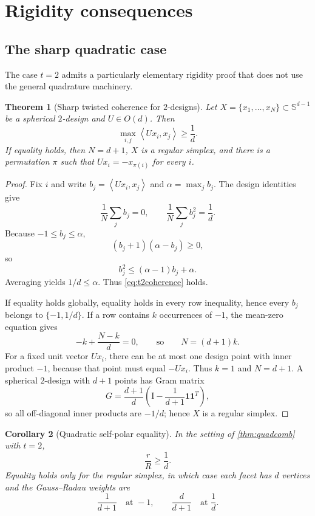 \documentclass[11pt]{amsart}
\newtheorem{theorem}{Theorem}[section]
\newtheorem{corollary}[theorem]{Corollary}
\theoremstyle{definition}
\theoremstyle{remark}
\newcommand{\Sph}{\mathbb S}
\newcommand{\Id}{\mathrm I}
\newcommand{\ip}[2]{\left\langle #1,#2\right\rangle}
\begin{document}
\section{Rigidity consequences}
\label{sec:rigidity}

\subsection{The sharp quadratic case}

The case $t=2$ admits a particularly elementary rigidity proof that does not use the general quadrature machinery.

\begin{theorem}[Sharp twisted coherence for $2$-designs]\label{thm:t2}
Let $X=\{x_1,\ldots,x_N\}\subset\Sph^{d-1}$ be a spherical $2$-design and $U\in O(d)$.  Then
\begin{equation}\label{eq:t2coherence}
 \max_{i,j}\ip{Ux_i}{x_j}\ge\frac1d.
\end{equation}
If equality holds, then $N=d+1$, $X$ is a regular simplex, and there is a permutation $\pi$ such that $Ux_i=-x_{\pi(i)}$ for every $i$.
\end{theorem}

\begin{proof}
Fix $i$ and write $b_j=\ip{Ux_i}{x_j}$ and $\alpha=\max_j b_j$.  The design identities give
\[
 \frac1N\sum_jb_j=0,
 \qquad
 \frac1N\sum_jb_j^2=\frac1d.
\]
Because $-1\le b_j\le\alpha$,
\[
 (b_j+1)(\alpha-b_j)\ge0,
\]
so
\[
 b_j^2\le(\alpha-1)b_j+\alpha.
\]
Averaging yields $1/d\le\alpha$.  Thus \eqref{eq:t2coherence} holds.

If equality holds globally, equality holds in every row inequality, hence every $b_j$ belongs to $\{-1,1/d\}$.  If a row contains $k$ occurrences of $-1$, the mean-zero equation gives
\[
 -k+\frac{N-k}{d}=0,
 \qquad\text{so}\qquad N=(d+1)k.
\]
For a fixed unit vector $Ux_i$, there can be at most one design point with inner product $-1$, because that point must equal $-Ux_i$.  Thus $k=1$ and $N=d+1$.  A spherical $2$-design with $d+1$ points has Gram matrix
\[
 G=\frac{d+1}{d}\left(\Id-\frac1{d+1}\mathbf1\mathbf1^T\right),
\]
so all off-diagonal inner products are $-1/d$; hence $X$ is a regular simplex.  \qedhere
\end{proof}

\begin{corollary}[Quadratic self-polar equality]\label{cor:t2selfpolar}
In the setting of \cref{thm:quadcomb} with $t=2$,
\[
 \frac rR\ge\frac1d.
\]
Equality holds only for the regular simplex, in which case each facet has $d$ vertices and the Gauss--Radau weights are
\[
 \frac1{d+1}\quad\text{at }-1,
 \qquad
 \frac d{d+1}\quad\text{at }\frac1d.
\]
\end{corollary}
\end{document}
